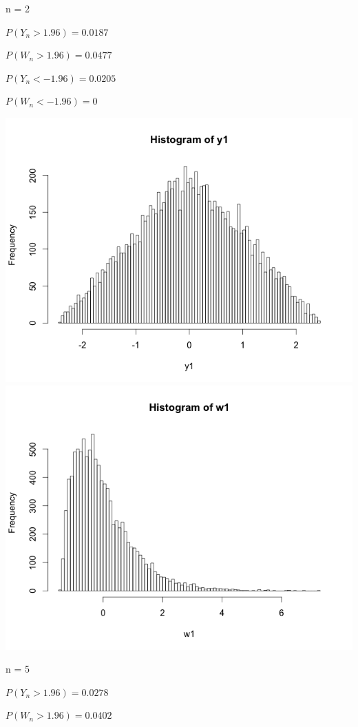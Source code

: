 \documentclass[12pt]{article}
\begin{document}
\begin{list}{()~}{}
\item

n = 2

$P(Y_n > 1.96) = 0.0187$

$P(W_n > 1.96) = 0.0477$

$P(Y_n < -1.96) = 0.0205$

$P(W_n < -1.96) = 0$ 

\includegraphics[width=1\textwidth]{Rplot01.png}
\includegraphics[width=1\textwidth]{Rplot05.png}

n = 5

$P(Y_n > 1.96) = 0.0278$

$P(W_n > 1.96) = 0.0402$


\end{list}
\end{document}
